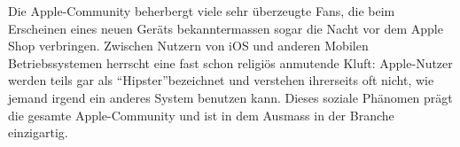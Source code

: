 Die \mbox{Apple-Community} beherbergt viele sehr überzeugte Fans, die beim Erscheinen eines neuen Geräts bekanntermassen sogar die Nacht vor dem Apple Shop verbringen. Zwischen Nutzern von iOS und anderen Mobilen Betriebssystemen herrscht eine fast schon religiös anmutende Kluft: \mbox{Apple-Nutzer} werden teils gar als ``Hipster''bezeichnet\thinspace\cite{online:ios-hipster} und verstehen ihrerseits oft nicht, wie jemand irgend ein anderes System benutzen kann. Dieses soziale Phänomen prägt die gesamte Apple-Community und ist in dem Ausmass in der Branche einzigartig.